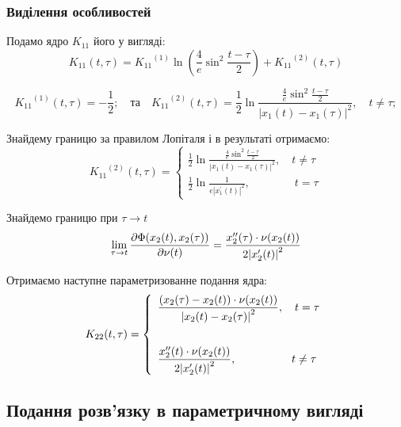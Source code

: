 \documentclass{beamer}
\numberwithin{equation}{section}
\begin{document}
	\begin{frame}
		\frametitle{Виділення особливостей}
		 Подамо ядро $K_{11}$ його у вигляді:
		$$
		\displaystyle
		K_{11}(t, \tau) = {K_{11}}^{(1)} \ln \left(\frac{4}{e} \sin ^{2}  \frac{t-\tau}{2}\right)+{K_{11}}^{(2)}(t, \tau)
		$$
		
		$$
		\displaystyle
		{K_{11}}^{(1)}(t, \tau) =-\frac{1}{2};
		\displaystyle
		\quad \text{та} \quad
		\displaystyle
		{K_{11}}^{(2)}(t, \tau) =\frac{1}{2} \ln{\frac{\frac{4}{e} \sin ^{2} \frac{t-\tau}{2}}{\left|x_{1}(t)-x_{1}(\tau)\right|^{2}}}, \quad t \neq \tau;
		$$
		
		 Знайдему границю за правилом Лопіталя і в результаті отримаємо:
		$$
		{K_{11}}^{(2)}(t, \tau) =
		\left\{
		\begin{array}{l}
			\displaystyle
			\frac{1}{2} \ln{\frac{\frac{4}{e} \sin ^{2} \frac{t-\tau}{2}}{\left|x_{1}(t)-x_{1}(\tau)\right|^{2}}}
			,\quad t \neq \tau
			\\ [1cm]
			
			\displaystyle
			\frac{1}{2} \ln \frac{1}{e\left|x_{1}^{\prime}(t)\right|^{2}}
			,\quad  \quad  \quad  \quad   t = \tau
		\end{array}
		\right.
		$$
		
	\end{frame}

	
	\begin{frame}
	    Знайдемо границю при $\tau \rightarrow t$
		$$
		\lim_{\tau \rightarrow t } \pdv{\Phi(x_{2}(t), x_{2}(\tau))}{\nu(t)} =
		\frac{  x''_{2}(\tau) \cdot \nu (x_2(t)) }{ 2\abs{ x'_{2}(t)}^2 } 
		$$
		
		Отримаємо наступне параметризованне подання ядра:
		$$
		K_{22}(t, \tau) = 
		\left\{
		\begin{array}{l}
			\displaystyle
			\frac{ \left( x_{2}(\tau) - x_{2}(t) \right) \cdot \nu (x_2(t)) }{ \abs{ x_{2}(t)-x_{2}(\tau) }^2 } 
			,\quad t = \tau
			\\ [1cm]
			
			\displaystyle
			\frac{  x''_{2}(t) \cdot \nu (x_2(t)) }{ 2\abs{ x'_{2}(t)}^2 } 
			,\quad \quad  \quad  \quad  \quad  t \neq \tau
		\end{array}
		\right.
		$$
	\end{frame}


	\subsection{Подання розв'язку в параметричному вигляді} 
\end{document}
